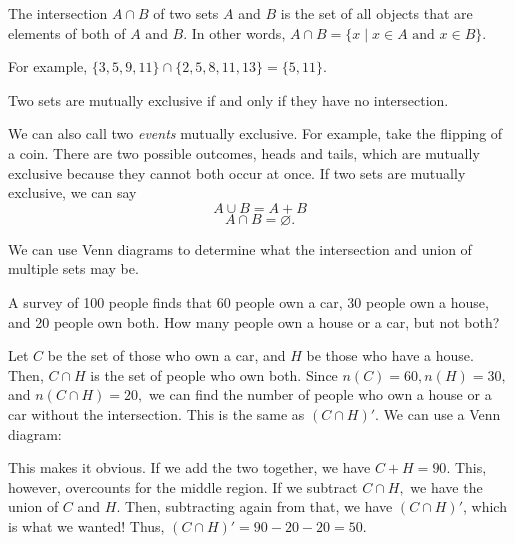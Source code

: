 \documentclass[11pt]{article}
\begin{document}
\begin{defn}
	The intersection $A \cap B$ of two sets $A$ and $B$ is the set of all objects that are elements of both of $A$ and $B$. In other words, $A \cap B = \{x \;|\; x \in A \text{ and } x \in B\}.$
\end{defn}
For example, $\{3,5,9,11\} \cap \{2,5,8,11,13\} = \{5,11\}$.
\begin{defn}
	Two sets are mutually exclusive if and only if they have no intersection.
\end{defn}
We can also call two \textit{events} mutually exclusive. For example, take the flipping of a coin. There are two possible outcomes, heads and tails, which are mutually exclusive because they cannot both occur at once. If two sets are mutually exclusive, we can say
\[A \cup B = A + B\]
\[A \cap B = \varnothing.\]

\noindent We can use Venn diagrams to determine what the intersection and union of multiple sets may be.
\begin{example}
	A survey of 100 people finds that 60 people own a car, 30 people own a house, and 20 people own both. How many people own a house or a car, but not both?
\end{example}
\begin{solution}
    Let $C$ be the set of those who own a car, and $H$ be those who have a house. Then, $C \cap H$ is the set of people who own both. Since $n(C) = 60, n(H) = 30,$ and $n(C \cap H) = 20,$ we can find the number of people who own a house or a car without the intersection. This is the same as $(C \cap H)'$. We can use a Venn diagram:

    \def\firstcircle{(0,0) circle (1.5cm)}
    \def\secondcircle{(0:2cm) circle (1.5cm)}
    
    
        
    \begin{center}
    \end{center}
    This makes it obvious. If we add the two together, we have $C + H = 90$. This, however, overcounts for the middle region. If we subtract $C \cap H,$ we have the union of $C$ and $H$. Then, subtracting again from that, we have $(C \cap H)'$, which is what we wanted! Thus, $(C \cap H)' = 90 - 20 - 20 = \boxed{50.}$
\end{solution}
\end{document}
